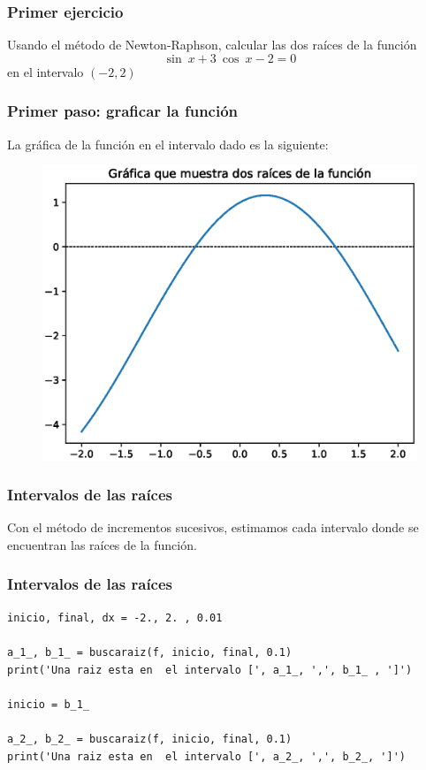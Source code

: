 \begin{frame}
\frametitle{Primer ejercicio}
Usando el método de Newton-Raphson, calcular las dos raíces de la función
\[ \sin \: x + 3 \: \cos \: x - 2 = 0  \]
en el intervalo $(-2, 2)$
\end{frame}
\begin{frame}
\frametitle{Primer paso: graficar la función}
La gráfica de la función en el intervalo dado es la siguiente:
\begin{figure}
	\centering
	\includegraphics[scale=0.5]{Imagenes/Ejercicio_NR_Seno_01.eps}
\end{figure}
\end{frame}
\begin{frame}[fragile]
\frametitle{Intervalos de las raíces}
Con el método de incrementos sucesivos, estimamos cada intervalo donde se encuentran las raíces de la función.
\end{frame}
\begin{frame}
\frametitle{Intervalos de las raíces}
\begin{lstlisting}[caption=Intervalos para las raíces, style=FormattedNumber, basicstyle=\linespread{1.1}\ttfamily=\small, columns=fullflexible]
inicio, final, dx = -2., 2. , 0.01

a_1_, b_1_ = buscaraiz(f, inicio, final, 0.1)
print('Una raiz esta en  el intervalo [', a_1_, ',', b_1_ , ']')

inicio = b_1_

a_2_, b_2_ = buscaraiz(f, inicio, final, 0.1)
print('Una raiz esta en  el intervalo [', a_2_, ',', b_2_, ']')
\end{lstlisting}
\end{frame}
